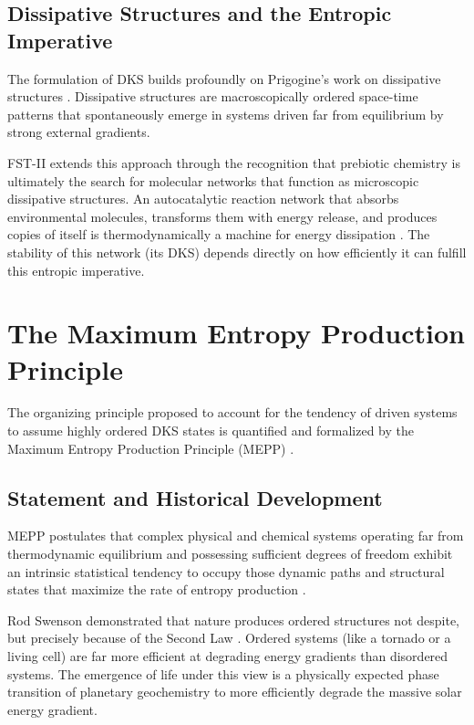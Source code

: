\documentclass[12pt,a4paper]{article}
\theoremstyle{remark}
\begin{document}
\subsection{Dissipative Structures and the Entropic Imperative}

The formulation of DKS builds profoundly on Prigogine's work on dissipative structures \citep{Bioenergetics}. Dissipative structures are macroscopically ordered space-time patterns that spontaneously emerge in systems driven far from equilibrium by strong external gradients.

FST-II extends this approach through the recognition that prebiotic chemistry is ultimately the search for molecular networks that function as microscopic dissipative structures. An autocatalytic reaction network that absorbs environmental molecules, transforms them with energy release, and produces copies of itself is thermodynamically a machine for energy dissipation \citep{Bioenergetics}. The stability of this network (its DKS) depends directly on how efficiently it can fulfill this entropic imperative.

\section{The Maximum Entropy Production Principle}
\label{sec:mepp}

The organizing principle proposed to account for the tendency of driven systems to assume highly ordered DKS states is quantified and formalized by the Maximum Entropy Production Principle (MEPP) \citep{EntropyMEPP,MEPP2006}.

\subsection{Statement and Historical Development}

MEPP postulates that complex physical and chemical systems operating far from thermodynamic equilibrium and possessing sufficient degrees of freedom exhibit an intrinsic statistical tendency to occupy those dynamic paths and structural states that maximize the rate of entropy production \citep{ThermodynamicsOrganisms}.

Rod Swenson demonstrated that nature produces ordered structures not despite, but precisely because of the Second Law \citep{ThermodynamicsLife}. Ordered systems (like a tornado or a living cell) are far more efficient at degrading energy gradients than disordered systems. The emergence of life under this view is a physically expected phase transition of planetary geochemistry to more efficiently degrade the massive solar energy gradient.
\end{document}
